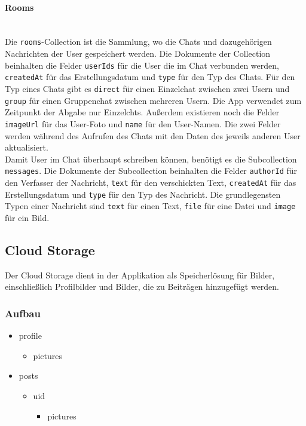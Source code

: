 \paragraph{Rooms}\mbox{} \\
Die \texttt{rooms}-Collection ist die Sammlung, wo die Chats und dazugehörigen Nachrichten der User gespeichert werden. Die Dokumente der Collection beinhalten die Felder \texttt{userIds} für die User die im Chat verbunden werden, \texttt{createdAt} für das Erstellungsdatum und \texttt{type} für den Typ des Chats. Für den Typ eines Chats gibt es \texttt{direct} für einen Einzelchat zwischen zwei Usern und \texttt{group} für einen Gruppenchat zwischen mehreren Usern. Die App verwendet zum Zeitpunkt der Abgabe nur Einzelchts. Außerdem existieren noch die Felder \texttt{imageUrl} für das User-Foto und \texttt{name} für den User-Namen. Die zwei Felder werden während des Aufrufen des Chats mit den Daten des jeweils anderen User aktualisiert.
\\
Damit User im Chat überhaupt schreiben können, benötigt es die Subcollection \texttt{messages}. Die Dokumente der Subcollection beinhalten die Felder \texttt{authorId} für den Verfasser der Nachricht, \texttt{text} für den verschickten Text, \texttt{createdAt} für das Erstellungsdatum und \texttt{type} für den Typ des Nachricht. Die grundlegensten Typen einer Nachricht sind \texttt{text} für einen Text, \texttt{file} für eine Datei und \texttt{image} für ein Bild.

\subsection{Cloud Storage}
Der Cloud Storage dient in der Applikation als Speicherlösung für Bilder, einschließlich Profilbilder und Bilder, die zu Beiträgen hinzugefügt werden.

\subsubsection{Aufbau}
\begin{itemize}
  \item profile
        \begin{itemize}
          \item pictures
        \end{itemize}
  \item posts
        \begin{itemize}
          \item {uid}
                \begin{itemize}
                  \item pictures
                \end{itemize}
        \end{itemize}
\end{itemize}

